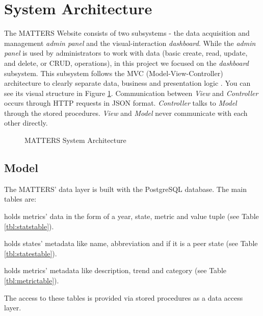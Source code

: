 	\section{System Architecture}
	
		The MATTERS Website consists of two subsystems - the data acquisition 
		and management \emph{admin panel} and the visual-interaction 
		\emph{dashboard}. While the \emph{admin panel} is used by administrators
		to work with data (basic create, read, update, and delete, or CRUD, 
		operations), in this project we focused on the \emph{dashboard} 
		subsystem. This subsystem follows the MVC (Model-View-Controller) 
		architecture to clearly separate data, business and presentation logic \cite{mvc}.
		You can see its visual structure in Figure \ref{fig:sysarch}. 
		Communication between \emph{View} and \emph{Controller} occurs through 
		HTTP requests in JSON format. \emph{Controller} talks to \emph{Model} 
		through the stored procedures. \emph{View} and \emph{Model} never 
		communicate with each other directly.
		
		\begin{figure}[t]
			\centering
			
			\caption{MATTERS System Architecture}
			\label{fig:sysarch}
		\end{figure}
		
		
		\subsection{Model}
			
			The MATTERS' data layer is built with the PostgreSQL database. The 
			main tables are:
			
			\begin{description}[itemsep=-1.5mm, align=right,labelwidth=3cm]
				\item [Statistics]
					holds metrics' data in the form of a year, state, metric and 
					value tuple (see Table \ref{tbl:statstable}).
				\item [States]
					holds states' metadata like name, abbreviation and if it is 
					a peer state (see Table \ref{tbl:statestable}).
				\item [Metrics]
					holds metrics' metadata like description, trend and 
					category (see Table \ref{tbl:metrictable}).
			\end{description}
			
			The access to these tables is provided via stored procedures as a 
			data access layer.
			
